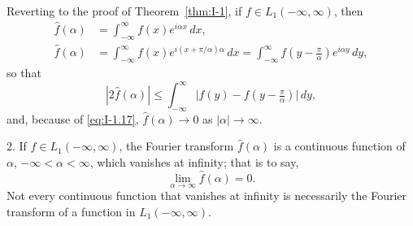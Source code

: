 Reverting to the proof of Theorem~\ref{thm:I-1}, if $f\in L_1(-\infty,\infty)$, then
\begin{align*}
\widehat f(\alpha)&=\int_{-\infty}^{\infty}f(x)e^{i\alpha x}\,dx,\\
\widehat f(\alpha)&=\int_{-\infty}^{\infty}f(x)e^{i(x+\pi/\alpha)\alpha}\,dx
=\int_{-\infty}^{\infty}f(y-\tfrac{\pi}{\alpha})e^{i\alpha y}\,dy,
\end{align*}
so that
\begin{equation*}
|2\widehat f(\alpha)|\le\int_{-\infty}^{\infty}\bigl|f(y)-f(y-\tfrac{\pi}{\alpha})\bigr|\,dy,
\end{equation*}
and, because of \eqref{eq:I-1.17}, $\hat f(\alpha)\to 0$ as $|\alpha|\to\infty$.

2. If $f\in L_1(-\infty,\infty)$, the Fourier transform $\hat f(\alpha)$ is a continuous function of $\alpha$, $-\infty<\alpha<\infty$, which vanishes at infinity; that is to say,
\begin{equation*}
\lim_{\alpha\to\infty}\widehat f(\alpha)=0.
\end{equation*}
Not every continuous function that vanishes at infinity is necessarily the Fourier transform of a function in $L_1(-\infty,\infty)$.

